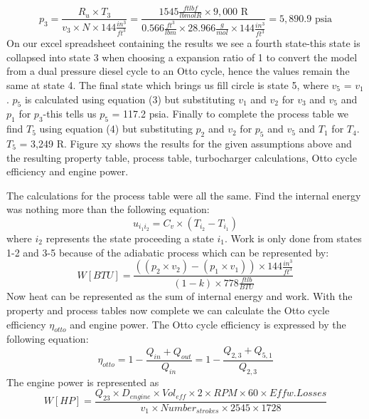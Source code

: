 \documentclass{article}
\begin{document}
\begin{equation}
    p_3 = \frac{R_u\times T_3}{v_3\times N\times 144\frac{in^3}{ft^3}} = \frac{1545\frac{ftlbf}{lbmolR}\times 9,000\mbox{ R}}{0.566 \frac{ft^3}{lbm}\times 28.966\frac{g}{mol}\times 144\frac{in^3}{ft^3}} = 5,890.9\mbox{ psia}
\end{equation}
\noindent On our excel spreadsheet containing the results we see a fourth state-this state is collapsed into state 3 when choosing a expansion ratio of 1 to convert the model from a dual pressure diesel cycle to an Otto cycle, hence the values remain the same at state 4. The final state which brings us fill circle is state 5, where $v_5$ = $v_1$. $p_5$ is calculated using equation (3) but substituting $v_1$ and $v_2$ for $v_3$ and $v_5$ and $p_1$ for $p_3$-this tells us $p_5$ = 117.2 psia. Finally to complete the process table we find $T_5$ using equation (4) but substituting $p_2$ and $v_2$ for $p_5$ and $v_5$ and $T_1$ for $T_4$. $T_5$ = 3,249 R. Figure xy shows the results for the given assumptions above and the resulting property table, process table, turbocharger calculations, Otto cycle efficiency and engine power.\par
The calculations for the process table were all the same. Find the internal energy was nothing more than the following equation:
\begin{equation}
    u_{i_1i_2} = C_v\times(T_{i_2}-T_{i_1})
\end{equation}
\noindent where $i_2$ represents the state proceeding a state $i_1$. Work is only done from states 1-2 and 3-5 because of the adiabatic process which can be represented by:
\begin{equation}
    W[BTU] = \frac{((p_2\times v_2) - (p_1\times v_1))\times 144\frac{in^3}{ft^3}}{(1-k)\times 778\frac{ftlb}{BTU}}
\end{equation}
\noindent Now heat can be represented as the sum of internal energy and work. With the property and process tables now complete we can calculate the Otto cycle efficiency $\eta_{otto}$ and engine power. The Otto cycle efficiency is expressed by the following equation:
\begin{equation}
    \eta_{otto} = 1 - \frac{Q_{in}+Q_{out}}{Q_{in}} = 1 - \frac{Q_{2,3}+Q_{5,1}}{Q_{2,3}}
\end{equation}
\noindent The engine power is represented as 
\begin{equation}
    W[HP] = \frac{Q_{23}\times D_{engine}\times Vol_{eff}\times 2\times RPM\times 60\times Eff w. Losses}{v_1\times Number_{strokes}\times 2545\times 1728}
\end{equation}
\end{document}
